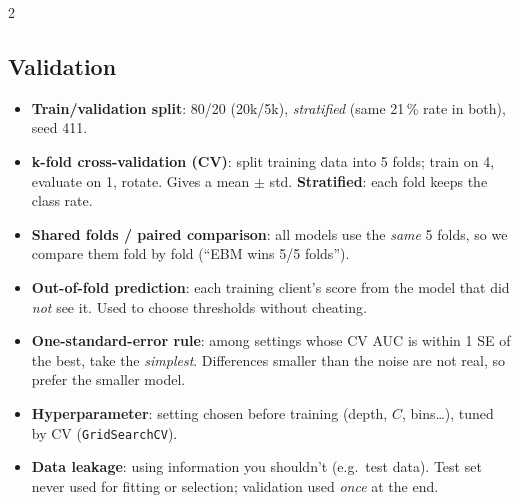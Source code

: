\documentclass[a4paper,9pt]{extarticle}
\newcommand{\term}[1]{\textbf{\color{accent}#1}}
\begin{document}
\begin{multicols}{2}
\subsection{Validation}
\begin{itemize}
\item \term{Train/validation split}: 80/20 (20k/5k), \emph{stratified} (same 21\,\% rate in both), seed 411.
\item \term{k-fold cross-validation (CV)}: split training data into 5 folds; train on 4, evaluate on 1, rotate.
      Gives a mean $\pm$ std. \term{Stratified}: each fold keeps the class rate.
\item \term{Shared folds / paired comparison}: all models use the \emph{same} 5 folds, so we compare them
      fold by fold (``EBM wins 5/5 folds'').
\item \term{Out-of-fold prediction}: each training client's score from the model that did \emph{not} see it.
      Used to choose thresholds without cheating.
\item \term{One-standard-error rule}: among settings whose CV AUC is within 1 SE of the best, take the
      \emph{simplest}. Differences smaller than the noise are not real, so prefer the smaller model.
\item \term{Hyperparameter}: setting chosen before training (depth, $C$, bins\ldots), tuned by CV
      (\texttt{GridSearchCV}).
\item \term{Data leakage}: using information you shouldn't (e.g.\ test data). Test set never used for fitting
      or selection; validation used \emph{once} at the end.
\end{itemize}


\end{multicols}
\end{document}
